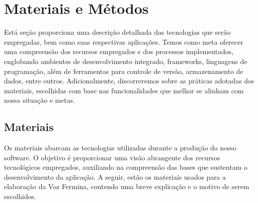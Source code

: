 \documentclass[
    article,			%
    12pt,				%
    oneside,            %
    a4paper,			%
    english,			%
    brazil,				%
    ]{abntex2}
\begin{document}
\section{Materiais e Métodos}
     Está seção proporciona uma descrição detalhada das tecnologias que serão empregadas, bem como suas respectivas aplicações. Temos como meta oferecer uma compreensão dos recursos empregados e dos processos implementados, englobando ambientes de desenvolvimento integrado, frameworks, linguagens de programação, além de ferramentas para controle de versão, armazenamento de dados, entre outros. Adicionalmente, discorreremos sobre as práticas adotadas dos materiais, escolhidas com base nas funcionalidades que melhor se alinham com nossa situação e metas.
    
\subsection{Materiais}
    Os materiais abarcam as tecnologias utilizadas durante a produção do nosso software. O objetivo é proporcionar uma visão abrangente dos recursos tecnológicos empregados, auxiliando na compreensão das bases que sustentam o desenvolvimento da aplicação. A seguir, estão os materiais usados para a elaboração da Voz Fermina, contendo uma breve explicação e o motivo de serem escolhidos.
    
\end{document}
